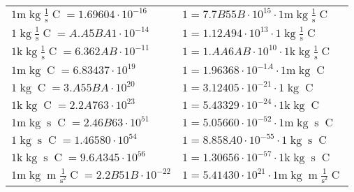 \begin{center}
\begin{longtable}{l l}
{\color{gray}$1 \bm{\mathrm{ m}}\operatorname{kg}{}\frac1{\operatorname{s}}{\operatorname{C}}{} = 1.69604\cdot10^{-16} $}   & {\color{gray}$ 1 = 7.7B55B\cdot10^{15} \cdot 1 \bm{\mathrm{ m}}\operatorname{kg}{}\frac1{\operatorname{s}}{\operatorname{C}}{}$}  \\
{\color{black}$1 \bm{\mathrm{ }}\operatorname{kg}{}\frac1{\operatorname{s}}{\operatorname{C}}{} = A.A5BA1\cdot10^{-14} $}   & {\color{black}$ 1 = 1.12A94\cdot10^{13} \cdot 1 \bm{\mathrm{ }}\operatorname{kg}{}\frac1{\operatorname{s}}{\operatorname{C}}{}$}  \\
{\color{gray}$1 \bm{\mathrm{ k}}\operatorname{kg}{}\frac1{\operatorname{s}}{\operatorname{C}}{} = 6.362AB\cdot10^{-11} $}   & {\color{gray}$ 1 = 1.AA6AB\cdot10^{10} \cdot 1 \bm{\mathrm{ k}}\operatorname{kg}{}\frac1{\operatorname{s}}{\operatorname{C}}{}$}  \\
{\color{gray}$1 \bm{\mathrm{ m}}\operatorname{kg}{}{}{\operatorname{C}}{} = 6.83437\cdot10^{19} $}   & {\color{gray}$ 1 = 1.96368\cdot10^{-1A} \cdot 1 \bm{\mathrm{ m}}\operatorname{kg}{}{}{\operatorname{C}}{}$}  \\
{\color{black}$1 \bm{\mathrm{ }}\operatorname{kg}{}{}{\operatorname{C}}{} = 3.A55BA\cdot10^{20} $}   & {\color{black}$ 1 = 3.12405\cdot10^{-21} \cdot 1 \bm{\mathrm{ }}\operatorname{kg}{}{}{\operatorname{C}}{}$}  \\
{\color{gray}$1 \bm{\mathrm{ k}}\operatorname{kg}{}{}{\operatorname{C}}{} = 2.2A763\cdot10^{23} $}   & {\color{gray}$ 1 = 5.43329\cdot10^{-24} \cdot 1 \bm{\mathrm{ k}}\operatorname{kg}{}{}{\operatorname{C}}{}$}  \\
{\color{gray}$1 \bm{\mathrm{ m}}\operatorname{kg}{}{\operatorname{s}}{\operatorname{C}}{} = 2.46B63\cdot10^{51} $}   & {\color{gray}$ 1 = 5.05660\cdot10^{-52} \cdot 1 \bm{\mathrm{ m}}\operatorname{kg}{}{\operatorname{s}}{\operatorname{C}}{}$}  \\
{\color{black}$1 \bm{\mathrm{ }}\operatorname{kg}{}{\operatorname{s}}{\operatorname{C}}{} = 1.46580\cdot10^{54} $}   & {\color{black}$ 1 = 8.858A0\cdot10^{-55} \cdot 1 \bm{\mathrm{ }}\operatorname{kg}{}{\operatorname{s}}{\operatorname{C}}{}$}  \\
{\color{gray}$1 \bm{\mathrm{ k}}\operatorname{kg}{}{\operatorname{s}}{\operatorname{C}}{} = 9.6A345\cdot10^{56} $}   & {\color{gray}$ 1 = 1.30656\cdot10^{-57} \cdot 1 \bm{\mathrm{ k}}\operatorname{kg}{}{\operatorname{s}}{\operatorname{C}}{}$}  \\
{\color{gray}$1 \bm{\mathrm{ m}}\operatorname{kg}{\operatorname{m}}\frac1{\operatorname{s}^2}{\operatorname{C}}{} = 2.2B51B\cdot10^{-22} $}   & {\color{gray}$ 1 = 5.41430\cdot10^{21} \cdot 1 \bm{\mathrm{ m}}\operatorname{kg}{\operatorname{m}}\frac1{\operatorname{s}^2}{\operatorname{C}}{}$}  \\

\end{longtable}
\end{center}
